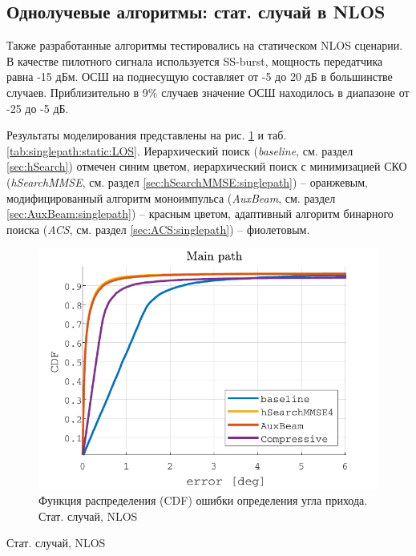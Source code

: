 \subsection{Однолучевые алгоритмы: стат. случай в NLOS }
\label{sec:singlepath:static:NLOS}

Также разработанные алгоритмы тестировались на статическом NLOS сценарии.
В качестве пилотного сигнала используется SS-burst, мощность передатчика равна -15 дБм.
ОСШ на поднесущую составляет от -5 до 20 дБ в большинстве случаев.
Приблизительно в 9\% случаев значение ОСШ находилось в диапазоне от -25 до -5 дБ.

Результаты моделирования представлены на рис. \ref{fig:singlepath:static:NLOS} и
таб. \ref{tab:singlepath:static:LOS}.  Иерархический поиск (\textit{baseline},
см. раздел \ref{sec:hSearch}) отмечен синим цветом, иерархический поиск с
минимизацией СКО (\textit{hSearchMMSE}, см. раздел
\ref{sec:hSearchMMSE:singlepath}) -- оранжевым, модифицированный алгоритм
моноимпульса (\textit{AuxBeam}, см. раздел \ref{sec:AuxBeam:singlepath}) --
красным цветом, адаптивный алгоритм бинарного поиска (\textit{ACS}, см. раздел
\ref{sec:ACS:singlepath}) -- фиолетовым.




\begin{figure}[ht]
  \centering
  \includegraphics{results/rus/singlepath-static-NLOS-1}
  \caption{Функция распределения (CDF) ошибки определения угла прихода. Стат. случай, NLOS}
  \label{fig:singlepath:static:NLOS}
\end{figure}
\begin{table}[h!]
  \begin{center}
    \caption{Стат. случай, NLOS}
    \small
    \label{tab:singlepath:static:NLOS}
  \end{center}
\end{table}

